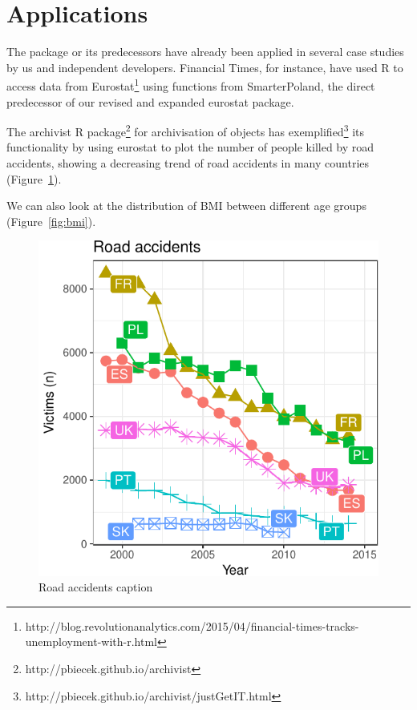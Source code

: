 \section{Applications}

The package or its predecessors have already been applied in several case studies by us and independent developers. Financial Times, for instance, have used R to access data from Eurostat\footnote{http://blog.revolutionanalytics.com/2015/04/financial-times-tracks-unemployment-with-r.html} using functions from SmarterPoland, the direct predecessor of our revised and expanded eurostat package.

The archivist R package\footnote{http://pbiecek.github.io/archivist} for archivisation of objects has exemplified\footnote{http://pbiecek.github.io/archivist/justGetIT.html} its functionality by using eurostat to plot the number of people killed by road accidents, showing a decreasing trend of road accidents in many countries (Figure~\ref{fig:roadaccidents}).

We can also look at the distribution of BMI between different age groups (Figure~\ref{fig:bmi}).


\begin{figure}
\begin{center}
\includegraphics{2015-manu-roadacc-1}
\end{center}
\caption{Road accidents caption}
\label{fig:roadaccidents}
\end{figure}


